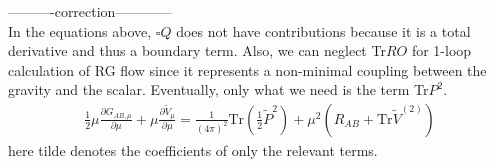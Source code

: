 \documentclass[fleqn]{article}
\begin{document}
----------correction------------ \\
In the equations above, $\square Q$ does not have contributions because it is a total derivative and thus a boundary term. Also, we can neglect Tr$RO$ for 1-loop calculation of RG flow since it represents a non-minimal coupling between the gravity and the scalar. Eventually, only what we need is the term Tr$P^{2}$. 
\begin{align}
\frac{1}{2} \mu \frac{\partial G_{AB,\mu}}{\partial \mu} + \mu \frac{\partial \tilde{V}_{\mu}} {\partial \mu} =\frac{1}{(4\pi)^{2}} \text{Tr} (\frac{1}{2} \tilde{P}^{2}) + \mu^{2}(R_{AB} + \text{Tr} \tilde{V}^{(2)})
 \end{align}
here tilde denotes the coefficients of only the relevant terms.
\end{document}
